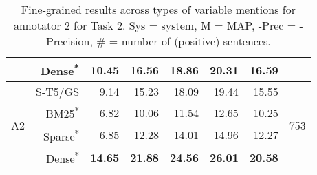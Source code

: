 \documentclass[11pt]{article}
\begin{document}
\begin{table*}[]
\begin{tabular}{l|r|r|r|r|r|r|c}
      &    Dense\textsuperscript{*} &  \textbf{10.45} &  \textbf{16.56} &   \textbf{18.86} &   \textbf{20.31} &        \textbf{16.59} &         \\
    \hline
    \hline
       \multirow{4}{2em}{A2} &    S-T5/GS &   9.14 &  15.23 &   18.09 &   19.44 &        15.55 &      \multirow{4}{2em}{753} \\
        &    BM25\textsuperscript{*} &   6.82 &  10.06 &   11.54 &   12.65 &        10.25 &       \\
        &    Sparse\textsuperscript{*} &   6.85 &  12.28 &   14.01 &   14.96 &        12.27 &       \\
        &    Dense\textsuperscript{*} &  \textbf{14.65} &  \textbf{21.88} &   \textbf{24.56} &   \textbf{26.01} &        \textbf{20.58} &       \\
    \hline
    \end{tabular}
    \caption{Fine-grained results across types of variable mentions for annotator 2 for Task 2. Sys = system, M = MAP, -Prec = -Precision, \# = number of (positive) sentences.}
    \label{tab:T2-Ann2}
\end{table*}
\end{document}
